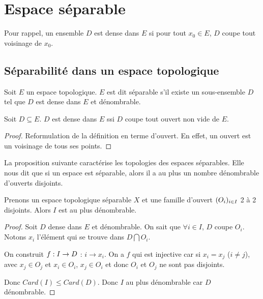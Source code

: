 \chapter{Espace séparable}

Pour rappel, un ensemble $D$ est dense dans $E$ si pour tout $x_{0} \in E$, $D$
coupe tout voisinage de $x_{0}$.

\section{Séparabilité dans un espace topologique}

\begin{definition}
	Soit $E$ un espace topologique.
	$E$ est dit séparable s'il existe un sous-ensemble $D$ tel que $D$ est dense
	dans $E$ et dénombrable.
\end{definition}

\begin{proposition}
	Soit $D \subseteq E$.
	$D$ est dense dans $E$ ssi $D$ coupe tout ouvert non vide de $E$.
\end{proposition}

\begin{proof}
	Reformulation de la définition en terme d'ouvert. En effet, un ouvert est un
	voisinage de tous ses points.
\end{proof}

La proposition suivante caractérise les topologies des espaces séparables. Elle
nous dit que si un espace est séparable, alors il a au plus un nombre
dénombrable d'ouverts disjoints.

\begin{proposition}
	Prenons un espace topologique séparable $X$ et une famille d'ouvert
	$(O_{i})_{i \in I}$ 2 à 2 disjoints. Alors $I$ est au plus dénombrable.
\end{proposition}

\begin{proof}
	Soit $D$ dense dans $E$ et dénombrable. On sait que $\forall i \in I$, $D$
	coupe $O_{i}$. Notons $x_{i}$ l'élément qui se trouve dans $D \bigcap
	O_{i}$.

	On construit $f : I \rightarrow D$ : $i \rightarrow x_{i}$. On a $f$ qui
	est injective car si $x_{i} = x_{j}$ ($i \neq j$), avec $x_{j} \in O_{j}$ et
	$x_{i} \in O_{i}$, $x_{j} \in O_{i}$ et donc $O_{i}$ et $O_{j}$ ne sont pas
	disjoints.

	Donc $Card(I) \leq Card(D)$. Donc $I$ au plus dénombrable car $D$ dénombrable.
\end{proof}

